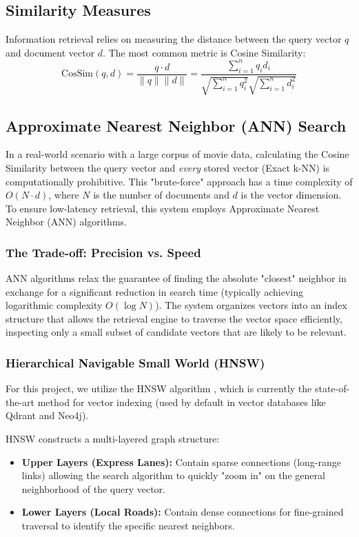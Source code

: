 \documentclass[a4paper, 12pt]{extreport}
\begin{document}
    \subsection{Similarity Measures}
    Information retrieval relies on measuring the distance between the query vector $q$ and document vector $d$. The most common metric is Cosine Similarity:
    \begin{equation}
        \text{CosSim}(q, d) = \frac{q \cdot d}{\|q\| \|d\|} = \frac{\sum_{i=1}^{n} q_i d_i}{\sqrt{\sum_{i=1}^{n} q_i^2} \sqrt{\sum_{i=1}^{n} d_i^2}}
    \end{equation}

    \subsection{Approximate Nearest Neighbor (ANN) Search}
 In a real-world scenario with a large corpus of movie data, calculating the Cosine Similarity between the query vector and \textit{every} stored vector (Exact k-NN) is computationally prohibitive. This "brute-force" approach has a time complexity of $O(N \cdot d)$, where $N$ is the number of documents and $d$ is the vector dimension. To ensure low-latency retrieval, this system employs Approximate Nearest Neighbor (ANN) algorithms.



\subsubsection{The Trade-off: Precision vs. Speed}
ANN algorithms relax the guarantee of finding the absolute "closest" neighbor in exchange for a significant reduction in search time (typically achieving logarithmic complexity $O(\log N)$). The system organizes vectors into an index structure that allows the retrieval engine to traverse the vector space efficiently, inspecting only a small subset of candidate vectors that are likely to be relevant.

\subsubsection{Hierarchical Navigable Small World (HNSW)}
For this project, we utilize the HNSW algorithm \cite{malkov2018efficient}, which is currently the state-of-the-art method for vector indexing (used by default in vector databases like Qdrant and Neo4j).

HNSW constructs a multi-layered graph structure:
\begin{itemize}
    \item[] \textbf{Upper Layers (Express Lanes):} Contain sparse connections (long-range links) allowing the search algorithm to quickly "zoom in" on the general neighborhood of the query vector.
    \item[] \textbf{Lower Layers (Local Roads):} Contain dense connections for fine-grained traversal to identify the specific nearest neighbors.
\end{itemize}
\end{document}
